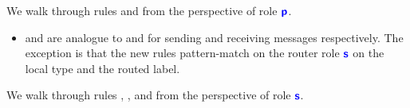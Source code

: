 \begin{figure}[!h]
\begin{prooftree}
\end{prooftree}

\begin{prooftree}
\end{prooftree}

\label{fig:newlocal}
\end{figure}

We walk through rules  and 
from the perspective of role $\role{p}$.

\begin{itemize}

\item {} and  are
analogue to  and 
for sending and receiving messages respectively.
The exception is that the new rules pattern-match
on the router role $\role{s}$ on the local type
and the routed label.

\end{itemize}

We walk through rules , ,
 and 
from the perspective of role $\role{s}$.

